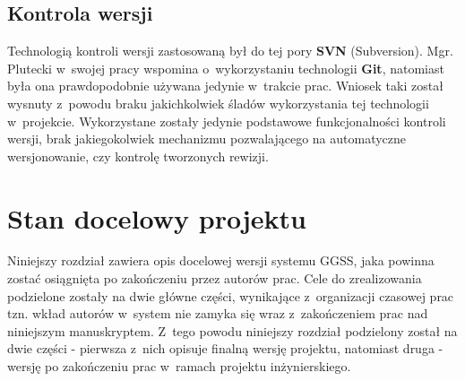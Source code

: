 \section{Kontrola wersji}

Technologią kontroli wersji zastosowaną był do tej pory \textbf{SVN} (Subversion). Mgr. Plutecki w~swojej pracy wspomina o~wykorzystaniu technologii \textbf{Git}, natomiast była ona prawdopodobnie używana jedynie w~trakcie prac. Wniosek taki został wysnuty z~powodu braku jakichkolwiek śladów wykorzystania tej technologii w~projekcie. Wykorzystane zostały jedynie podstawowe funkcjonalności kontroli wersji, brak jakiegokolwiek mechanizmu pozwalającego na automatyczne wersjonowanie, czy kontrolę tworzonych rewizji.



\chapter{Stan docelowy projektu}
\label{cha:docel}
Niniejszy rozdział zawiera opis docelowej wersji systemu GGSS, jaka powinna zostać osiągnięta po zakończeniu przez autorów prac. Cele do zrealizowania podzielone zostały na dwie główne części, wynikające z~organizacji czasowej prac tzn. wkład autorów w~system nie zamyka się wraz z~zakończeniem prac nad niniejszym manuskryptem. Z~tego powodu niniejszy rozdział podzielony został na dwie części - pierwsza z~nich opisuje finalną wersję projektu, natomiast druga - wersję po zakończeniu prac w~ramach projektu inżynierskiego.

